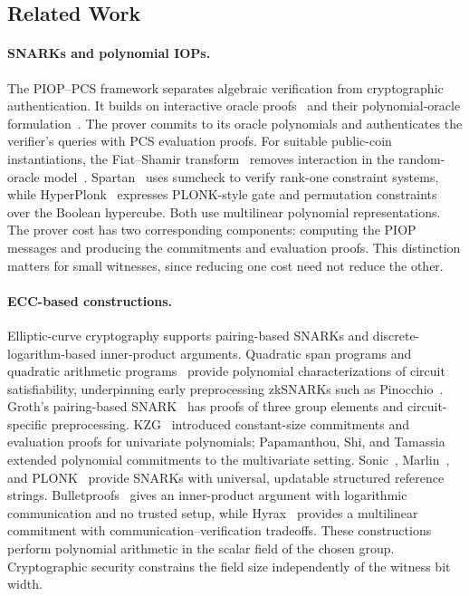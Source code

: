 \subsection{Related Work}
\label{sec:related-work}

\paragraph{SNARKs and polynomial IOPs.}
The PIOP--PCS framework separates algebraic verification from
cryptographic authentication. It builds on interactive oracle
proofs~\cite{tcc/Ben-SassonCS16} and their polynomial-oracle
formulation~\cite{eurocrypt/BunzFS20,eurocrypt/ChiesaHMMVW20}.
The prover commits to its oracle polynomials and authenticates
the verifier's queries with PCS evaluation proofs.
For suitable public-coin instantiations, the
Fiat--Shamir transform~\cite{crypto/FiatS86} removes interaction in
the random-oracle model~\cite{tcc/Ben-SassonCS16,eurocrypt/BunzFS20}.
Spartan~\cite{crypto/Setty20} uses sumcheck to verify rank-one
constraint systems, while HyperPlonk~\cite{eurocrypt/ChenBBZ23}
expresses PLONK-style gate and permutation constraints over the
Boolean hypercube. Both use multilinear polynomial representations.
The prover cost has two corresponding components: computing the
PIOP messages and producing the commitments and evaluation proofs.
This distinction matters for small witnesses, since reducing one
cost need not reduce the other.

\paragraph{ECC-based constructions.}
Elliptic-curve cryptography supports pairing-based SNARKs and
discrete-logarithm-based inner-product arguments.
Quadratic span programs and quadratic arithmetic
programs~\cite{eurocrypt/GennaroGP013} provide polynomial
characterizations of circuit satisfiability, underpinning early
preprocessing zkSNARKs such as Pinocchio~\cite{cacm/ParnoHG016}.
Groth's pairing-based SNARK~\cite{eurocrypt/Groth16} has proofs
of three group elements and circuit-specific preprocessing.
KZG~\cite{asiacrypt/KateZG10} introduced constant-size commitments
and evaluation proofs for univariate polynomials; Papamanthou,
Shi, and Tamassia~\cite{tcc/PapamanthouST13} extended polynomial
commitments to the multivariate setting.
Sonic~\cite{ccs/MallerBKM19}, Marlin~\cite{eurocrypt/ChiesaHMMVW20},
and PLONK~\cite{iacr/GabizonWC19} provide SNARKs with universal,
updatable structured reference strings.
Bulletproofs~\cite{sp/BunzBBPWM18} gives an inner-product argument
with logarithmic communication and no trusted setup, while
Hyrax~\cite{sp/WahbyTSTW18} provides a multilinear commitment with
communication--verification tradeoffs.
These constructions perform polynomial arithmetic in the scalar
field of the chosen group. Cryptographic security constrains the
field size independently of the witness bit width.

